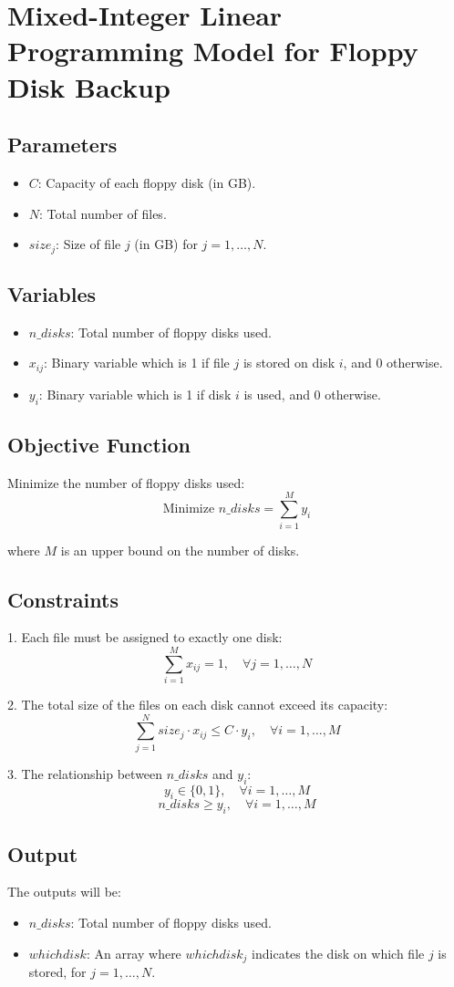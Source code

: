 \documentclass{article}
\begin{document}
\section*{Mixed-Integer Linear Programming Model for Floppy Disk Backup}

\subsection*{Parameters}
\begin{itemize}
    \item $C$: Capacity of each floppy disk (in GB).
    \item $N$: Total number of files.
    \item $size_j$: Size of file $j$ (in GB) for $j = 1, \ldots, N$.
\end{itemize}

\subsection*{Variables}
\begin{itemize}
    \item $n\_disks$: Total number of floppy disks used.
    \item $x_{ij}$: Binary variable which is 1 if file $j$ is stored on disk $i$, and 0 otherwise.
    \item $y_i$: Binary variable which is 1 if disk $i$ is used, and 0 otherwise.
\end{itemize}

\subsection*{Objective Function}
Minimize the number of floppy disks used:
\[
\text{Minimize } n\_disks = \sum_{i=1}^{M} y_i
\]

where $M$ is an upper bound on the number of disks.

\subsection*{Constraints}
1. Each file must be assigned to exactly one disk:
\[
\sum_{i=1}^{M} x_{ij} = 1, \quad \forall j = 1, \ldots, N
\]

2. The total size of the files on each disk cannot exceed its capacity:
\[
\sum_{j=1}^{N} size_j \cdot x_{ij} \leq C \cdot y_i, \quad \forall i = 1, \ldots, M
\]

3. The relationship between $n\_disks$ and $y_i$:
\[
y_i \in \{0, 1\}, \quad \forall i = 1, \ldots, M
\]
\[
n\_disks \geq y_i, \quad \forall i = 1, \ldots, M
\]

\subsection*{Output}
The outputs will be:
\begin{itemize}
    \item $n\_disks$: Total number of floppy disks used.
    \item $whichdisk$: An array where $whichdisk_j$ indicates the disk on which file $j$ is stored, for $j = 1, \ldots, N$.
\end{itemize}
\end{document}
